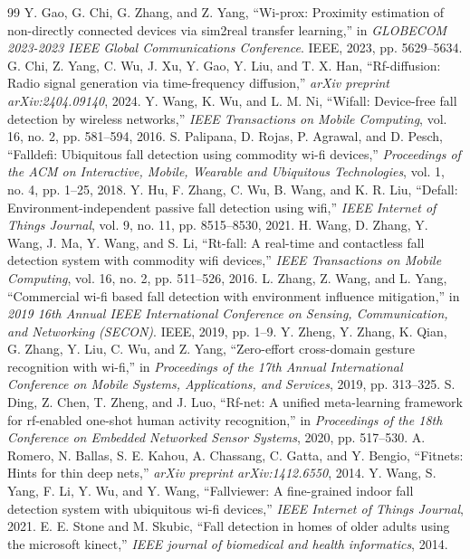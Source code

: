 \documentclass[UTF8,twocolumn]{ctexart}
\begin{document}
\begin{thebibliography}{99}
 Y. Gao, G. Chi, G. Zhang, and Z. Yang, “Wi-prox: Proximity estimation of non-directly connected devices via sim2real transfer learning,” in \emph{GLOBECOM 2023-2023 IEEE Global Communications Conference}. IEEE, 2023, pp. 5629–5634.
 G. Chi, Z. Yang, C. Wu, J. Xu, Y. Gao, Y. Liu, and T. X. Han, “Rf-diffusion: Radio signal generation via time-frequency diffusion,” \emph{arXiv preprint arXiv:2404.09140}, 2024.
 Y. Wang, K. Wu, and L. M. Ni, “Wifall: Device-free fall detection by wireless networks,” \emph{IEEE Transactions on Mobile Computing}, vol. 16, no. 2, pp. 581–594, 2016.
 S. Palipana, D. Rojas, P. Agrawal, and D. Pesch, “Falldefi: Ubiquitous fall detection using commodity wi-fi devices,” \emph{Proceedings of the ACM on Interactive, Mobile, Wearable and Ubiquitous Technologies}, vol. 1, no. 4, pp. 1–25, 2018.
 Y. Hu, F. Zhang, C. Wu, B. Wang, and K. R. Liu, “Defall: Environment-independent passive fall detection using wifi,” \emph{IEEE Internet of Things Journal}, vol. 9, no. 11, pp. 8515–8530, 2021.
 H. Wang, D. Zhang, Y. Wang, J. Ma, Y. Wang, and S. Li, “Rt-fall: A real-time and contactless fall detection system with commodity wifi devices,” \emph{IEEE Transactions on Mobile Computing}, vol. 16, no. 2, pp. 511–526, 2016.
 L. Zhang, Z. Wang, and L. Yang, “Commercial wi-fi based fall detection with environment influence mitigation,” in \emph{2019 16th Annual IEEE International Conference on Sensing, Communication, and Networking (SECON)}. IEEE, 2019, pp. 1–9.
 Y. Zheng, Y. Zhang, K. Qian, G. Zhang, Y. Liu, C. Wu, and Z. Yang, “Zero-effort cross-domain gesture recognition with wi-fi,” in \emph{Proceedings of the 17th Annual International Conference on Mobile Systems, Applications, and Services}, 2019, pp. 313–325.
 S. Ding, Z. Chen, T. Zheng, and J. Luo, “Rf-net: A unified meta-learning framework for rf-enabled one-shot human activity recognition,” in \emph{Proceedings of the 18th Conference on Embedded Networked Sensor Systems}, 2020, pp. 517–530.
 A. Romero, N. Ballas, S. E. Kahou, A. Chassang, C. Gatta, and Y. Bengio, “Fitnets: Hints for thin deep nets,” \emph{arXiv preprint arXiv:1412.6550}, 2014.
 Y. Wang, S. Yang, F. Li, Y. Wu, and Y. Wang, “Fallviewer: A fine-grained indoor fall detection system with ubiquitous wi-fi devices,” \emph{IEEE Internet of Things Journal}, 2021.
 E. E. Stone and M. Skubic, “Fall detection in homes of older adults using the microsoft kinect,” \emph{IEEE journal of biomedical and health informatics}, 2014.

\end{thebibliography}
\end{document}

